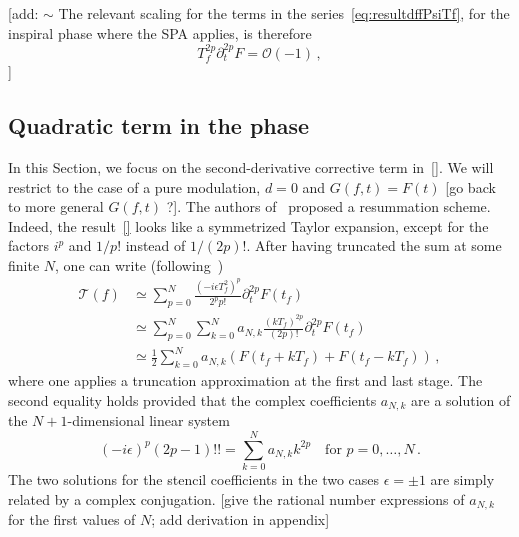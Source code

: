 \documentclass[aps,showpacs,twocolumn,
prd,superscriptaddress,nofootinbib]{revtex4-1}
\newcommand{\be}{\begin{equation}}
\newcommand{\ee}{\end{equation}}
\newcommand\calO{{\mathcal{O}}}
\newcommand\calT{{\mathcal{T}}}
\newcommand{\nn}{\nonumber}
\newcommand{\tf}{t_{f}}
\newcommand{\Tf}{T_{f}}
\newcommand{\SM}[1]{{\color{Red} #1}}
\begin{document}
\SM{[add: $\sim$ The relevant scaling for the terms in the series~\eqref{eq:resultdffPsiTf}, for the inspiral phase where the SPA applies, is therefore
\be
	\Tf^{2p} \partial_{t}^{2p} F = \calO(-1) \,,
\ee]}




\subsection{Quadratic term in the phase}
\label{subsec:resumquadphase}

In this Section, we focus on the second-derivative corrective term in~\eqref{}. We will restrict to the case of a pure modulation, $d=0$ and $G(f,t) = F(t)$ [go back to more general $G(f,t)$ ?]. The authors of~\cite{KCY14} proposed a resummation scheme. Indeed, the result~\eqref{} looks like a symmetrized Taylor expansion, except for the factors $i^{p}$ and $1/p!$ instead of $1/(2p)!$. After having truncated the sum at some finite $N$, one can write (following~\cite{KCY14})
\begin{align}\label{eq:resumquadphase}
	\calT(f) &\simeq \sum\limits_{p = 0}^{N} \frac{(-i\epsilon\Tf^{2})^{p}}{2^{p}p!} \partial_{t}^{2p}F(\tf) \nn\\
	&\simeq \sum\limits_{p= 0}^{N} \sum\limits_{k=0}^{N} a_{N,k}\frac{(k\Tf)^{2p}}{(2p)!}  \partial_{t}^{2p}F(\tf) \nn\\
	&\simeq \frac{1}{2}\sum\limits_{k=0}^{N} a_{N,k} \left( F(\tf + k\Tf) + F(\tf-k\Tf) \right)\,,
\end{align}
where one applies a truncation approximation at the first and last stage. The second equality holds provided that the complex coefficients $a_{N,k}$ are a solution of the $N+1$-dimensional linear system~\cite{KCY14}
\be\label{eq:stencilsystem}
	(-i\epsilon)^{p} (2p-1)!! = \sum\limits_{k=0}^{N} a_{N,k} k^{2p} \quad \text{for } p=0,\dots,N \,.
\ee
The two solutions for the stencil coefficients in the two cases $\epsilon = \pm 1$ are simply related by a complex conjugation. \SM{[give the rational number expressions of $a_{N,k}$ for the first values of $N$; add derivation in appendix]}
\end{document}

